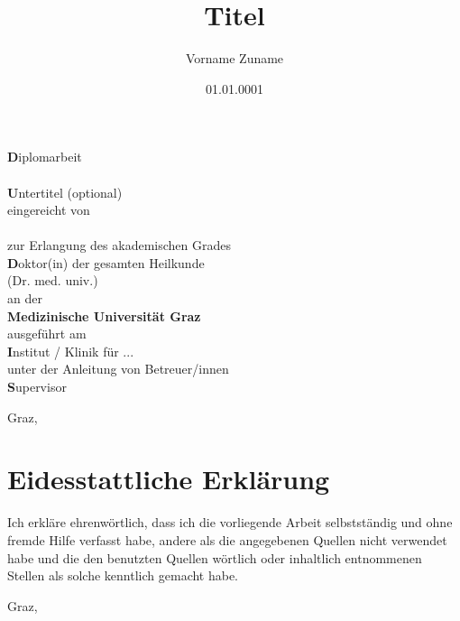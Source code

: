 \documentclass[onecolumn, 12pt, a4paper]{article}
\title{Titel}
\author{Vorname Zuname}
\date{01.01.0001}
\def\thesistype {Diplomarbeit}
\def\subtitle {Untertitel (optional)}
\def\place {Graz}
\def\degree {Doktor(in) der gesamten Heilkunde\\(Dr. med. univ.) }
\def\institut {Institut / Klinik für ...}
\def\supervisor {Supervisor}
\def\uni {Medizinische Universität Graz}
\begin{document}

\thispagestyle{empty}
\addvspace{5mm}  %


\begin{titlepage}
    \makeatletter
    \thispagestyle{empty}
    \doublespacing
    \begin{center}
        {\textbf\thesistype} \\
        \vspace{1cm}
        {\LARGE\textbf\textsc{\@title}} \\
        {\Large\textbf\subtitle} \\
        \vspace{2cm}
        eingereicht von\\
        {\large\textbf \@author} \\
        \vspace{2cm}
        zur Erlangung des akademischen Grades \\
        \vspace{0.2cm}
        {\large\textbf\degree} \\
        an der \\
        \vspace{2cm}
        {\large\textbf{\uni}} \\
        \vspace{0.3cm}
        ausgeführt am \\
        {\large\textbf\institut} \\
        \vspace{0.3cm}
        unter der Anleitung von Betreuer/innen \\
        {\large\textbf\supervisor{}} \\
    \end{center}
    \vfill
    \place, \@date
    \makeatother
\end{titlepage}

\section*{Eidesstattliche Erklärung}

\begin{itshape}
Ich erkläre ehrenwörtlich, dass ich die vorliegende Arbeit selbstständig und ohne
fremde Hilfe verfasst habe, andere als die angegebenen Quellen nicht verwendet
habe und die den benutzten Quellen wörtlich oder inhaltlich entnommenen Stellen
als solche kenntlich gemacht habe.

\vspace{2cm}
\makeatletter
\noindent \place, \@date \hfill \@author
\makeatother
\end{itshape}
\end{document}
